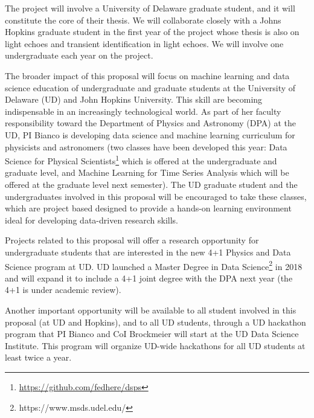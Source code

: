 The project will involve a University of Delaware graduate student, and it will constitute the core of their thesis.  We will collaborate closely with a Johns Hopkins graduate student in the first year of the project whose thesis is also on light echoes and transient identification in light echoes.  We will involve one undergraduate each year on the project. 

The broader impact of this proposal will focus on machine learning and data science education of undergraduate and graduate students at the University of Delaware (UD) and John Hopkins University. 
This skill are becoming indispensable in an increasingly technological world.  As part of her faculty responsibility toward the Department of Physics and Astronomy (DPA) at the UD, PI Bianco is developing data science and machine learning curriculum for physicists and astronomers (two classes have been developed this year: Data Science for Physical Scientists\footnote{\url{https://github.com/fedhere/dsps}} which is offered at the undergraduate and graduate level, and Machine Learning for Time Series Analysis which will be offered at the graduate level next semester). 
The UD graduate student and the undergraduates involved in this proposal will be encouraged to take these classes, which are project based designed to provide a hands-on learning environment ideal for developing data-driven research skills. 

Projects related to this proposal will offer a research opportunity for undergraduate students that are interested in the new 4+1 Physics and Data Science program at UD. UD launched a Master Degree in Data Science\footnote{https://www.msds.udel.edu/} in 2018 and will expand it to include a 4+1 joint degree with the DPA next year (the 4+1 is under academic review).

Another important opportunity  will be available to all student involved in this proposal (at UD and Hopkins), and to all UD students, through a UD hackathon program that PI Bianco and CoI Brockmeier will start at the UD Data Science Institute.  This program will organize UD-wide hackathons for all UD students at least twice a year.

